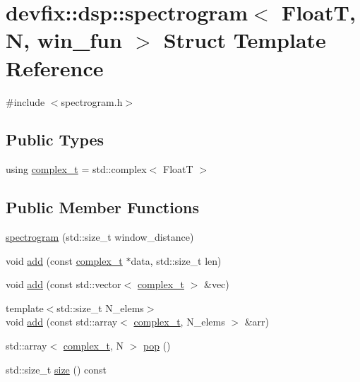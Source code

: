 \hypertarget{structdevfix_1_1dsp_1_1spectrogram}{}\section{devfix\+:\+:dsp\+:\+:spectrogram$<$ FloatT, N, win\+\_\+fun $>$ Struct Template Reference}
\label{structdevfix_1_1dsp_1_1spectrogram}


{\ttfamily \#include $<$spectrogram.\+h$>$}

\subsection*{Public Types}
\begin{DoxyCompactItemize}
\item 
using \hyperlink{structdevfix_1_1dsp_1_1spectrogram_a920fdda446509cfe81fa287773c709cb}{complex\+\_\+t} = std\+::complex$<$ FloatT $>$
\end{DoxyCompactItemize}
\subsection*{Public Member Functions}
\begin{DoxyCompactItemize}
\item 
\hyperlink{structdevfix_1_1dsp_1_1spectrogram_ad1d11586447533319ec37e5e9de6e6e9}{spectrogram} (std\+::size\+\_\+t window\+\_\+distance)
\item 
void \hyperlink{structdevfix_1_1dsp_1_1spectrogram_a9204dfb17067382f9e01295bc349d4f1}{add} (const \hyperlink{structdevfix_1_1dsp_1_1spectrogram_a920fdda446509cfe81fa287773c709cb}{complex\+\_\+t} $\ast$data, std\+::size\+\_\+t len)
\item 
void \hyperlink{structdevfix_1_1dsp_1_1spectrogram_abf5e5730f6248014f7ee5a22a0e96662}{add} (const std\+::vector$<$ \hyperlink{structdevfix_1_1dsp_1_1spectrogram_a920fdda446509cfe81fa287773c709cb}{complex\+\_\+t} $>$ \&vec)
\item 
{\footnotesize template$<$std\+::size\+\_\+t N\+\_\+elems$>$ }\\void \hyperlink{structdevfix_1_1dsp_1_1spectrogram_a030123c941c6acc6ea535514c2d138da}{add} (const std\+::array$<$ \hyperlink{structdevfix_1_1dsp_1_1spectrogram_a920fdda446509cfe81fa287773c709cb}{complex\+\_\+t}, N\+\_\+elems $>$ \&arr)
\item 
std\+::array$<$ \hyperlink{structdevfix_1_1dsp_1_1spectrogram_a920fdda446509cfe81fa287773c709cb}{complex\+\_\+t}, N $>$ \hyperlink{structdevfix_1_1dsp_1_1spectrogram_acdc5a2253a62ae50ae24607cd4f3b555}{pop} ()
\item 
std\+::size\+\_\+t \hyperlink{structdevfix_1_1dsp_1_1spectrogram_a6dc48452751bc4b4f4e14088998ddbb7}{size} () const
\end{DoxyCompactItemize}


